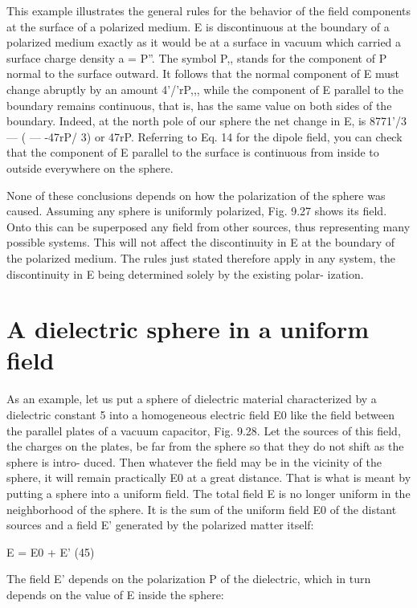 This example illustrates the general rules for the behavior of the
field components at the surface of a polarized medium. E is discontinuous
at the boundary of a polarized medium exactly as it
would be at a surface in vacuum which carried a surface charge
density a = P''. The symbol P,, stands for the component of P
normal to the surface outward. It follows that the normal component
of E must change abruptly by an amount 4'/'rP,,, while the
component of E parallel to the boundary remains continuous, that
is, has the same value on both sides of the boundary. Indeed, at the
north pole of our sphere the net change in E, is 8771'/3  ---  ( --- -47rP/ 3)
or 47rP. Referring to Eq. 14 for the dipole field, you can check that
the component of E parallel to the surface is continuous from inside
to outside everywhere on the sphere.

None of these conclusions depends on how the polarization of
the sphere was caused. Assuming any sphere is uniformly polarized,
Fig. 9.27 shows its field. Onto this can be superposed any field from
other sources, thus representing many possible systems. This will
not affect the discontinuity in E at the boundary of the polarized
medium. The rules just stated therefore apply in any system, the
discontinuity in E being determined solely by the existing polar-
ization.

\section{A dielectric sphere in a uniform field}

As an example, let us put a sphere of dielectric material characterized
by a dielectric constant 5 into a homogeneous electric field E0
like the field between the parallel plates of a vacuum capacitor,
Fig. 9.28. Let the sources of this field, the charges on the plates,
be far from the sphere so that they do not shift as the sphere is intro-
duced. Then whatever the field may be in the vicinity of the sphere,
it will remain practically E0 at a great distance. That is what is meant
by putting a sphere into a uniform field. The total field E is no
longer uniform in the neighborhood of the sphere. It is the sum of
the uniform field E0 of the distant sources and a field E' generated
by the polarized matter itself:

\begin{equation}
\end{equation}
E = E0 + E' (45)

The field E' depends on the polarization P of the dielectric, which in
turn depends on the value of E inside the sphere:

